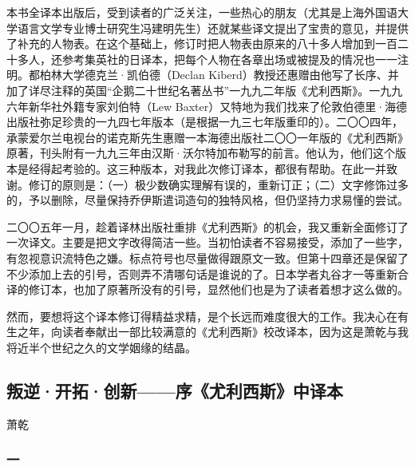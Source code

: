 \par 本书全译本出版后，受到读者的广泛关注，一些热心的朋友（尤其是上海外国语大学语言文学专业博士研究生冯建明先生）还就某些译文提出了宝贵的意见，并提供了补充的人物表。在这个基础上，修订时把人物表由原来的八十多人增加到一百二十多人，还参考集英社的日译本，把每个人物在各章出场或被提及的情况也一一注明。都柏林大学德克兰·凯伯德（Declan Kiberd）教授还惠赠由他写了长序、并加了详尽注释的英国“企鹅二十世纪名著丛书”一九九二年版《尤利西斯》。一九九六年新华社外籍专家刘伯特（Lew Baxter）又特地为我们找来了伦敦伯德里·海德出版社弥足珍贵的一九四七年版本（是根据一九三七年版重印的）。二〇〇四年，承蒙爱尔兰电视台的诺克斯先生惠赠一本海德出版社二〇〇一年版的《尤利西斯》原著，刊头附有一九九三年由汉斯·沃尔特加布勒写的前言。他认为，他们这个版本是经得起考验的。这三种版本，对我此次修订译本，都很有帮助。在此一并致谢。修订的原则是：（一）极少数确实理解有误的，重新订正；（二）文字修饰过多的，予以删除，尽量保持乔伊斯遣词造句的独特风格，但仍坚持力求易懂的尝试。
\par 二〇〇五年一月，趁着译林出版社重排《尤利西斯》的机会，我又重新全面修订了一次译文。主要是把文字改得简洁一些。当初怕读者不容易接受，添加了一些字，有忽视意识流特色之嫌。标点符号也尽量做得跟原文一致。但第十四章还是保留了不少添加上去的引号，否则弄不清哪句话是谁说的了。日本学者丸谷才一等重新合译的修订本，也加了原著所没有的引号，显然他们也是为了读者着想才这么做的。
\par 然而，要想将这个译本修订得精益求精，是个长远而难度很大的工作。我决心在有生之年，向读者奉献出一部比较满意的《尤利西斯》校改译本，因为这是萧乾与我将近半个世纪之久的文学姻缘的结晶。


\subsection*{叛逆·开拓·创新——序《尤利西斯》中译本}
\begin{center}
    萧乾
\end{center}

\subsubsection*{一}

